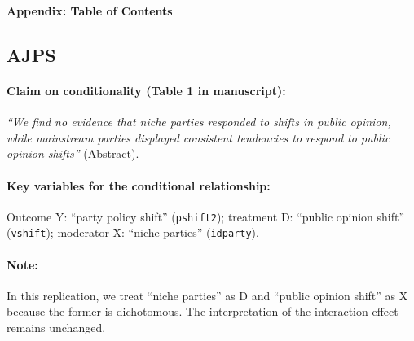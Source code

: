 \documentclass[12pt]{article}
\begin{document}
\clearpage

\textbf{Appendix: Table of Contents}
\startcontents[sections]
\onehalfspacing
\newpage


\subsection{\citet{Adams2006} AJPS} \label{adams}

\paragraph{Claim on conditionality (Table 1 in manuscript):} \emph{``We find no evidence that niche parties responded to shifts in public opinion, while mainstream parties displayed consistent tendencies to respond to public opinion shifts''} (Abstract). 

\paragraph{Key variables for the conditional relationship:} Outcome Y:
``party policy shift'' (\texttt{pshift2}); treatment D: ``public opinion shift'' (\texttt{vshift}); moderator X: ``niche parties'' (\texttt{idparty}). 

\paragraph{Note:} In this replication, we treat ``niche parties'' as D and ``public opinion shift'' as X because the former is dichotomous. The interpretation of the interaction effect remains unchanged.


\bigskip
\clearpage
\end{document}
